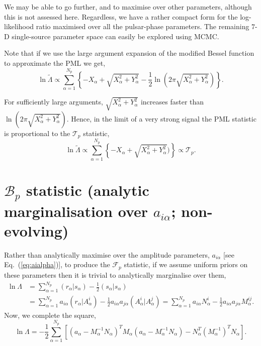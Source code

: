 \documentclass[twocolappendix,tighten]{emulateapj}
\begin{document}
We may be able to go further, and to maximise over other parameters, although this is not assessed here. Regardless, we have a rather compact form for the log-likelihood ratio maximised over all the pulsar-phase parameters. The remaining $7$-D single-source parameter space can easily be explored using MCMC.

Note that if we use the large argument expansion of the modified Bessel function to approximate the PML we get,
\begin{equation}
\ln\tilde\Lambda \propto \sum_{\alpha=1}^{N_p}\left\{-X_{\alpha} + \sqrt{X_{\alpha}^2+Y_{\alpha}^2}-\frac{1}{2}\ln\left(2\pi\sqrt{X_{\alpha}^2+Y_{\alpha}^2}\right)\right\}.
\end{equation}

For sufficiently large arguments, $\sqrt{X_{\alpha}^2+Y_{\alpha}^2}$ increases faster than $\ln\left(2\pi\sqrt{X_{\alpha}^2+Y_{\alpha}^2}\right)$. Hence, in the limit of a very strong signal the PML statistic is proportional to the $\mathcal{T}_p$ statistic,
\begin{equation}
\ln\tilde\Lambda \propto \sum_{\alpha=1}^{N_p}\left\{-X_{\alpha} + \sqrt{X_{\alpha}^2+Y_{\alpha}^2})\right\} \propto\mathcal{T}_p.
\end{equation}


\section{$\mathcal{B}_p$ statistic (analytic marginalisation over $a_{i\alpha}$; non-evolving)}

Rather than analytically maximise over the amplitude parameters, $a_{i\alpha}$ [see Eq.\ (\ref{eq:aialpha})], to produce the $\mathcal{F}_p$ statistic, if we assume uniform priors on these parameters then it is trivial to analytically marginalise over them,
\begin{align}
\ln\Lambda &= \sum_{\alpha=1}^{N_p} (r_{\alpha}|s_{\alpha}) - \frac{1}{2}(s_{\alpha}|s_{\alpha}) \nonumber\\
&= \sum_{\alpha=1}^{N_p} a_{i\alpha}(r_{\alpha}|A^i_{\alpha}) - \frac{1}{2}a_{i\alpha}a_{j\alpha}(A^i_{\alpha}|A^j_{\alpha}) = \sum_{\alpha=1}^{N_p} a_{i\alpha}N^i_{\alpha} - \frac{1}{2}a_{i\alpha}a_{j\alpha}M^{ij}_{\alpha}. %
\end{align}
Now, we complete the square,
\begin{equation}
\ln\Lambda = -\frac{1}{2}\sum_{\alpha=1}^{N_p}\left[\left(a_{\alpha}-M_{\alpha}^{-1}N_{\alpha}\right)^T M_{\alpha}\left(a_{\alpha}-M_{\alpha}^{-1}N_{\alpha}\right) - N_{\alpha}^T \left(M_{\alpha}^{-1}\right)^T N_{\alpha}\right].
\end{equation}
\end{document}
